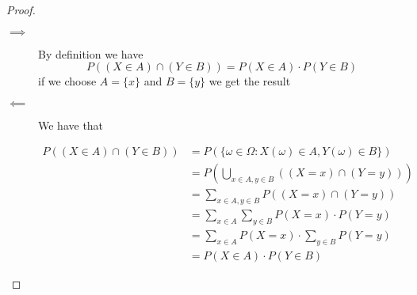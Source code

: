 \documentclass[10pt]{extarticle}
\newcommand{\skiplineafterproof}{$ $\par\nobreak\ignorespaces}
\begin{document}
\begin{proof}
    \skiplineafterproof
    \begin{description}
        \item[$\implies$] By definition we have
            $$
                P((X \in A) \cap (Y \in B)) = P(X \in A) \cdot P(Y \in B)
            $$
            if we choose $A = \{x\}$ and $B = \{y\}$ we get the result

        \item[$\impliedby$] We have that

            \begin{align*}
                P((X \in A) \cap (Y \in B)) & = P \left(\{\omega \in \Omega: X(\omega) \in A, Y(\omega) \in B\} \right)       \\
                                            & = P\left(\bigcup_{x \in A, y \in B} \left( (X = x) \cap (Y = y) \right) \right) \\
                                            & = \sum_{x \in A, y \in B} P((X = x) \cap (Y = y))                               \\
                                            & = \sum_{x \in A} \sum_{y \in B} P(X = x) \cdot P(Y = y)                         \\
                                            & = \sum_{x \in A} P(X = x) \cdot \sum_{y \in B} P(Y = y)                         \\
                                            & = P(X \in A) \cdot P(Y \in B)
            \end{align*}
    \end{description}
\end{proof}
\end{document}
